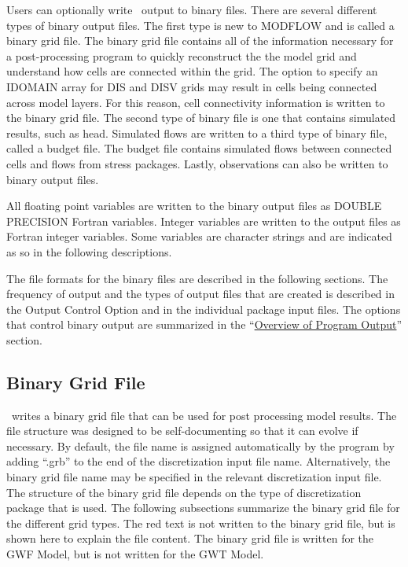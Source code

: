 Users can optionally write \mf~output to binary files.  There are several different types of binary output files.  The first type is new to MODFLOW and is called a binary grid file.  The binary grid file contains all of the information necessary for a post-processing program to quickly reconstruct the the model grid and understand how cells are connected within the grid.  The option to specify an IDOMAIN array for DIS and DISV grids may result in cells being connected across model layers.  For this reason, cell connectivity information is written to the binary grid file. The second type of binary file is one that contains simulated results, such as head.  Simulated flows are written to a third type of binary file, called a budget file.  The budget file contains simulated flows between connected cells and flows from stress packages.  Lastly, observations can also be written to binary output files.

All floating point variables are written to the binary output files as DOUBLE PRECISION Fortran variables. Integer variables are written to the output files as Fortran integer variables. Some variables are character strings and are indicated as so in the following descriptions.

The file formats for the binary files are described in the following sections. The frequency of output and the types of output files that are created is described in the Output Control Option and in the individual package input files.  The options that control binary output are summarized in the ``\hyperref[sec:outputoverview]{Overview of Program Output}'' section.

\newpage
\subsection{Binary Grid File}
\mf~writes a binary grid file that can be used for post processing model results.  The file structure was designed to be self-documenting so that it can evolve if necessary.  By default, the file name is assigned automatically by the program by adding ``.grb'' to the end of the discretization input file name.  Alternatively, the binary grid file name may be specified in the relevant discretization input file.  The structure of the binary grid file depends on the type of discretization package that is used.  The following subsections summarize the binary grid file for the different grid types.  The red text is not written to the binary grid file, but is shown here to explain the file content.  The binary grid file is written for the GWF Model, but is not written for the GWT Model.

